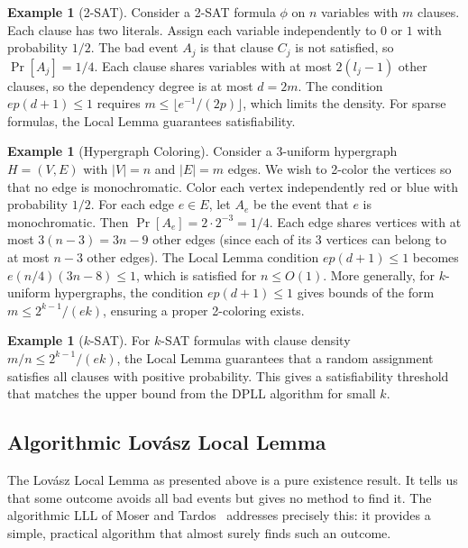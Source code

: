 \documentclass[twoside,12pt]{book}
\theoremstyle{plain}
\theoremstyle{definition}
\newtheorem{example}[theorem]{Example}
\theoremstyle{remark}
\begin{document}
\begin{example}[2-SAT]
Consider a 2-SAT formula $\phi$ on $n$ variables with $m$ clauses. Each
clause has two literals. Assign each variable independently to $0$ or $1$
with probability $1/2$. The bad event $A_j$ is that clause $C_j$ is not
satisfied, so $\Pr[A_j] = 1/4$. Each clause shares variables with at most
$2(l_j - 1)$ other clauses, so the dependency degree is at most $d = 2m$.
The condition $ep(d+1) \leq 1$ requires $m \leq \lfloor e^{-1}/(2p) \rfloor$,
which limits the density. For sparse formulas, the Local Lemma guarantees
satisfiability.
\end{example}

\begin{example}[Hypergraph Coloring]
\label{ex:hypergraph}
Consider a 3-uniform hypergraph $H = (V, E)$ with $|V| = n$ and
$|E| = m$ edges. We wish to 2-color the vertices so that no edge is
monochromatic. Color each vertex independently red or blue with probability
$1/2$. For each edge $e \in E$, let $A_e$ be the event that $e$ is
monochromatic. Then $\Pr[A_e] = 2 \cdot 2^{-3} = 1/4$. Each edge shares
vertices with at most $3(n-3) = 3n - 9$ other edges (since each of its 3
vertices can belong to at most $n - 3$ other edges). The Local Lemma
condition $ep(d+1) \leq 1$ becomes $e(n/4)(3n - 8) \leq 1$, which is
satisfied for $n \leq O(1)$. More generally, for $k$-uniform hypergraphs,
the condition $ep(d+1) \leq 1$ gives bounds of the form $m \leq
2^{k-1} / (ek)$, ensuring a proper 2-coloring exists.
\end{example}

\begin{example}[$k$-SAT]
For $k$-SAT formulas with clause density $m/n \leq 2^{k-1}/(ek)$,
the Local Lemma guarantees that a random assignment satisfies all clauses
with positive probability. This gives a satisfiability threshold that
matches the upper bound from the DPLL algorithm for small $k$.
\end{example}

\subsection{Algorithmic Lov\'asz Local Lemma}
\label{sec:algorithmic-lll}

The Lov\'asz Local Lemma as presented above is a pure existence
result. It tells us that some outcome avoids all bad events but gives
no method to find it. The algorithmic LLL of Moser and
Tardos~\cite{mosertardos2010} addresses precisely this: it provides a
simple, practical algorithm that almost surely finds such an outcome.
\end{document}
